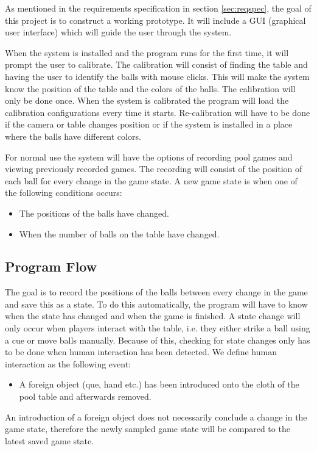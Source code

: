 As mentioned in the requirements specification in section \ref{sec:reqspec}, the goal of this project is to construct a working prototype. It will include a GUI (graphical user interface) which will guide the user through the system.

When the system is installed and the program runs for the first time, it will prompt the user to calibrate. The calibration will consist of finding the table and having the user to identify the balls with mouse clicks. This will make the system know the position of the table and the colors of the balls. The calibration will only be done once. When the system is calibrated the program will load the calibration configurations every time it starts. Re-calibration will have to be done if the camera or table changes position or if the system is installed in a place where the balls have different colors.

For normal use the system will have the options of recording pool games and viewing previously recorded games. The recording will consist of the position of each ball for every change in the game state. A new game state is when one of the following conditions occurs: 
\begin{itemize}
	\item The positions of the balls have changed.
	\item When the number of balls on the table have changed.
\end{itemize}

\subsection{Program Flow}
The goal is to record the positions of the balls between every change in the game and save this as a state. To do this automatically, the program will have to know when the state has changed and when the game is finished. A state change will only occur when players interact with the table, i.e. they either strike a ball using a cue or move balls manually. Because of this, checking for state changes only has to be done when human interaction has been detected. We define human interaction as the following event:
\begin{itemize}
	\item  A foreign object (que, hand etc.) has been introduced onto the cloth of the pool table and afterwards removed.
\end{itemize}

An introduction of a foreign object does not necessarily conclude a change in the game state, therefore the newly sampled game state will be compared to the latest saved game state.

